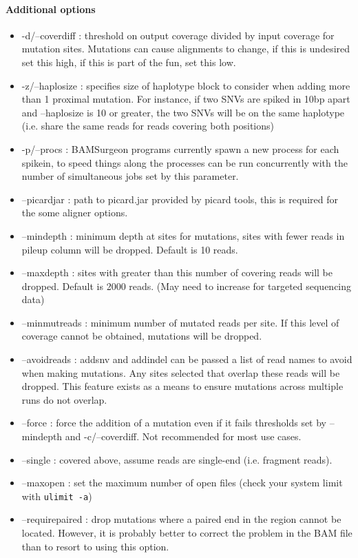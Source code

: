 \documentclass[letterpaper,11pt]{article}
\begin{document}
\paragraph{Additional options}
\begin{itemize}
\item -d/--coverdiff : threshold on output coverage divided by input coverage for mutation sites. Mutations can cause alignments to change, if this is undesired set this high, if this is part of the fun, set this low.
\item -z/--haplosize : specifies size of haplotype block to consider when adding more than 1 proximal mutation. For instance, if two SNVs are spiked in 10bp apart and --haplosize is 10 or greater, the two SNVs will be on the same haplotype (i.e. share the same reads for reads covering both positions)
\item -p/--procs : BAMSurgeon programs currently spawn a new process for each spikein, to speed things along the processes can be run concurrently with the number of simultaneous jobs set by this parameter.
\item --picardjar : path to picard.jar provided by picard tools, this is required for the some aligner options.
\item --mindepth : minimum depth at sites for mutations, sites with fewer reads in pileup column will be dropped. Default is 10 reads.
\item --maxdepth : sites with greater than this number of covering reads will be dropped. Default is 2000 reads. (May need to increase for targeted sequencing data)
\item --minmutreads : minimum number of mutated reads per site. If this level of coverage cannot be obtained, mutations will be dropped.
\item --avoidreads : addsnv and addindel can be passed a list of read names to avoid when making mutations. Any sites selected that overlap these reads will be dropped. This feature exists as a means to ensure mutations across multiple runs do not overlap.
\item --force : force the addition of a mutation even if it fails thresholds set by --mindepth and -c/--coverdiff. Not recommended for most use cases.
\item --single : covered above, assume reads are single-end (i.e. fragment reads).
\item --maxopen : set the maximum number of open files (check your system limit with \texttt{ulimit -a})
\item --requirepaired : drop mutations where a paired end in the region cannot be located. However, it is probably better to correct the problem in the BAM file than to resort to using this option.

\end{itemize}
\end{document}
